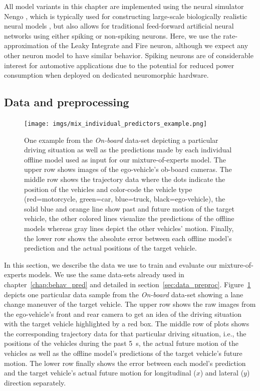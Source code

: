 All model variants in this chapter are implemented using the neural simulator Nengo \parencite{Bekolay2014}, which is typically used for constructing large-scale biologically realistic neural models \parencite{Eliasmith2013}, but also allows for traditional feed-forward artificial neural networks using either spiking or non-spiking neurons.
Here, we use the rate-approximation of the Leaky Integrate and Fire neuron, although we expect any other neuron model to have similar behavior.
Spiking neurons are of considerable interest for automotive applications due to the potential for reduced power consumption when deployed on dedicated neuromorphic hardware. 


\subsection{Data and preprocessing}%
\label{subsec:data_and_preprocessing}
\begin{figure}[th!]
    \centering
    \texttt{[image: imgs/mix\_individual\_predictors\_example.png]}
    \caption{One example from the \emph{On-board} data-set depicting a particular driving situation as well as the predictions made by each individual offline model used as input for our mixture-of-experts model.
        The upper row shows images of the ego-vehicle's ob-board cameras.
        The middle row shows the trajectory data where the dots indicate the position of the vehicles and color-code the vehicle type (red=motorcycle, green=car, blue=truck, black=ego-vehicle), the solid blue and orange line show past and future motion of the target vehicle, the other colored lines visualize the predictions of the offline models whereas gray lines depict the other vehicles' motion.
        Finally, the lower row shows the absolute error between each offline model's prediction and the actual positions of the target vehicle.
    }
    \label{fig:mix_individual_predictors_example}
\end{figure}

In this section, we describe the data we use to train and evaluate our mixture-of-experts models.
We use the same data-sets already used in chapter~\ref{chap:behav_pred} and detailed in section~\ref{sec:data_preproc}.
Figure~\ref{fig:mix_individual_predictors_example} depicts one particular data sample from the \emph{On-board} data-set showing a lane change maneuver of the target vehicle.
The upper row shows the raw images from the ego-vehicle's front and rear camera to get an idea of the driving situation with the target vehicle highlighted by a red box.
The middle row of plots shows the corresponding trajectory data for that particular driving situation, i.e., the positions of the vehicles during the past \SI{5}{\second}, the actual future motion of the vehicles as well as the offline model's predictions of the target vehicle's future motion.
The lower row finally shows the error between each model's prediction and the target vehicle's actual future motion for longitudinal ($x$) and lateral ($y$) direction separately.

